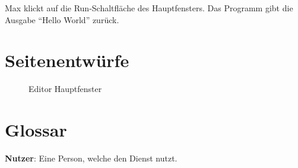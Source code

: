 \documentclass[parskip=full,11pt,twoside]{scrartcl}
\begin{document}
{Max klickt auf die Run-Schaltfläche des Hauptfensters.}
{Das Programm gibt die Ausgabe \enquote{Hello World} zurück.}

\pagebreak
\appendix

\section{Seitenentwürfe}

\begin{figure}[hb]
\caption{\label{fig:editor}
Editor Hauptfenster
}
\end{figure}

\section{Glossar}

\textbf{Nutzer}:
Eine Person, welche den Dienst nutzt.
\end{document}
